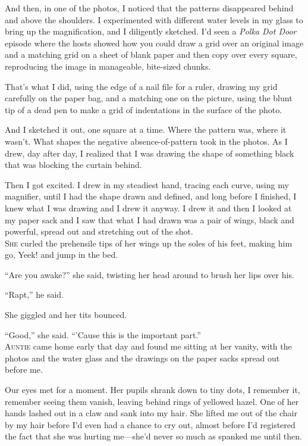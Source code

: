 \documentclass{article}
\begin{document}
And then, in one of the photos, I noticed that the patterns
disappeared behind and above the shoulders.  I experimented with
different water levels in my glass to bring up the magnification, and
I diligently sketched.  I'd seen a \textit{Polka Dot Door} episode
where the hosts showed how you could draw a grid over an original
image and a matching grid on a sheet of blank paper and then copy over
every square, reproducing the image in manageable, bite-sized chunks.

That's what I did, using the edge of a nail file for a ruler, drawing
my grid carefully on the paper bag, and a matching one on the picture,
using the blunt tip of a dead pen to make a grid of indentations in
the surface of the photo.

And I sketched it out, one square at a time.  Where the pattern was,
where it wasn't.  What shapes the negative absence-of-pattern took in
the photos.  As I drew, day after day, I realized that I was drawing
the shape of something black that was blocking the curtain behind.

Then I got excited.  I drew in my steadiest hand, tracing each curve,
using my magnifier, until I had the shape drawn and defined, and long
before I finished, I knew what I was drawing and I drew it anyway.  I
drew it and then I looked at my paper sack and I saw that what I had
drawn was a pair of wings, black and powerful, spread out and
stretching out of the shot.
\\
\lettrine[lines=3, lhang=.5, nindent=0pt, findent=2pt]{S}{he} curled the prehensile tips of her wings up the soles of his feet,
making him go, Yeek!  and jump in the bed.

``Are you awake?'' she said, twisting her head around to brush her
lips over his.

``Rapt,'' he said.

She giggled and her tits bounced.

``Good,'' she said.  ``'Cause this is the important part.''
\\
\lettrine[lines=3, lhang=.5, nindent=0pt, findent=2pt]{A}{untie} came home early that day and found me sitting at her vanity,
with the photos and the water glass and the drawings on the paper
sacks spread out before me.

Our eyes met for a moment.  Her pupils shrank down to tiny dots, I
remember it, remember seeing them vanish, leaving behind rings of
yellowed hazel.  One of her hands lashed out in a claw and sank into
my hair.  She lifted me out of the chair by my hair before I'd even
had a chance to cry out, almost before I'd registered the fact that
she was hurting me---she'd never so much as spanked me until then.
\end{document}
